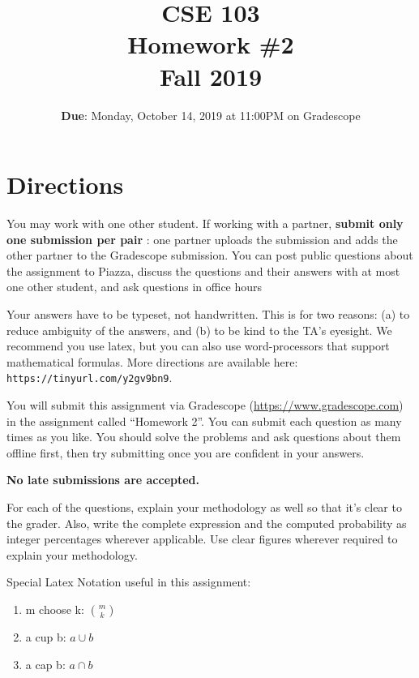 \documentclass[12pt, oneside]{article}
\title{\bf CSE 103 \\[2ex]
       \Large Homework \#2\\ Fall 2019}
\begin{document}
\newcommand{\SubItem}[1]{
    {\setlength\itemindent{15pt} \item[] #1}
}

\date{\textbf{Due}: Monday, October 14, 2019 at 11:00PM on Gradescope}

\section{Directions}

You may work with one other student. If working with a partner,
\textbf{submit only one submission per pair} : one partner uploads the submission and adds the other partner to the Gradescope submission. You can post public questions about the assignment to Piazza, discuss the questions and their answers with at most one other student, and ask questions in office hours

Your answers have to be typeset, not handwritten. This is for two
reasons: (a) to reduce ambiguity of the answers, and (b) to be kind to
the TA's eyesight. We recommend you use latex, but you can also use
word-processors that support mathematical formulas. More directions
are available here: {\tt https://tinyurl.com/y2gv9bn9}.

You will submit this assignment via Gradescope
(\url{https://www.gradescope.com}) in the assignment called ``Homework
2''. You can submit each question as many times as you like. You should solve the problems and ask questions about them offline first, then try submitting once you are confident in your answers. 

\textbf{No late submissions are accepted.}


For each of the questions, explain your methodology as well so that it's clear to the grader. Also, write the complete expression and the computed probability as integer percentages wherever applicable. Use clear figures wherever required to explain your methodology.

Special Latex Notation useful in this assignment: 
\begin{enumerate}
\item m choose k: ${m \choose k}$
\item a cup b: ${a \cup b}$
\item a cap b: ${a \cap b}$
\end{enumerate}
\end{document}
